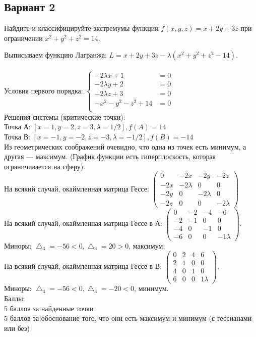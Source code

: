 \documentclass[addpoints, answers]{exam} %
\begin{document}
\subsection{Вариант 2}
\begin{questions}
\question[10] Найдите и классифицируйте экстремумы функции $f(x,y,z)=x+2y+3z$ при ограничении $x^2+y^2+z^2=14$.\\

   \begin{solution}
Выписываем функцию Лагранжа: $L=x+2y+3z-\lambda (x^2+y^2+z^2-14)$.\\\\
Условия первого порядка:
$\left\{\begin{aligned}
-2\lambda x+1&=0\\
-2\lambda y+2&=0\\
-2\lambda z+3&=0\\
-x^2-y^2-z^2+14&=0\\
\end{aligned}\right.$\\
Решения системы (критические точки): \\
Точка А: $\left[ x=1,y=2,z=3,\lambda=1/2\right], f(A)=14$\\
Точка В: $\left[ x=-1,y=-2,z=-3,\lambda=-1/2\right], f(B)=-14$\\
Из геометрических соображений очевидно, что одна из точек есть минимум, а другая --- максимум. (График функции есть гиперплоскость, которая ограничивается на сферу).\\
На всякий случай, окаймленная матрица Гессе:
$\left(\begin{array}{cccc}
0 & -2x & -2y & -2z\\
-2x & -2\lambda & 0 & 0\\
-2y & 0 & -2\lambda & 0\\
-2z & 0 & 0 & -2\lambda
\end{array}\right)$\\
На всякий случай, окаймленная матрица Гессе в А: 
$\left(\begin{array}{cccc}
0 & -2 & -4 & -6\\
-2 & -1 & 0 & 0\\
-4 & 0 & -1 & 0\\
-6 & 0 & 0 & -1\lambda
\end{array}\right)$.\\
Миноры: $\bigtriangleup_4=-56<0, \bigtriangleup_3=20>0$, максимум.\\
На всякий случай, окаймленная матрица Гессе в В: 
$\left(\begin{array}{cccc}
0 & 2 & 4 & 6\\
2 & 1 & 0 & 0\\
4 & 0 & 1 & 0\\
6 & 0 & 0 & 1\lambda
\end{array}\right)$.\\
Миноры: $\bigtriangleup_4=-56<0, \bigtriangleup_3=-20<0$, минимум.\\
Баллы:\\
5 баллов за найденные точки\\
5 баллов за обоснование того, что они есть максимум и минимум (с гессианами или без)
   \end{solution}
    

\end{questions}
\end{document}
